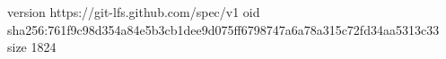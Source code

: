 version https://git-lfs.github.com/spec/v1
oid sha256:761f9c98d354a84e5b3cb1dee9d075ff6798747a6a78a315c72fd34aa5313c33
size 1824
